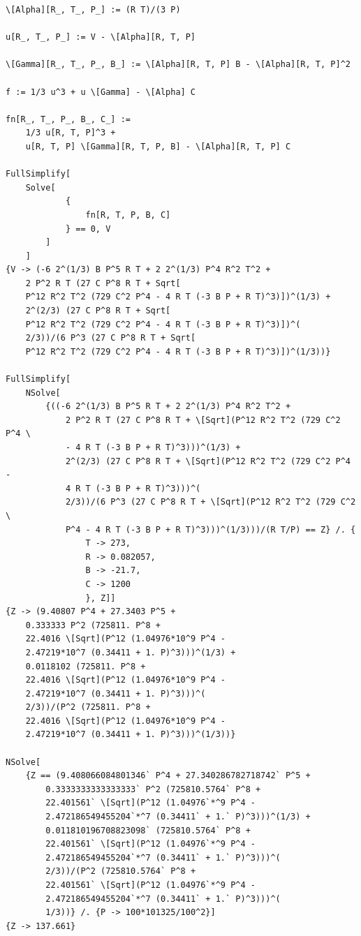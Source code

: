 \documentclass{IMTexam}
\begin{document}
\begin{questions}
\begin{parts}
\begin{solution}
            \end{solution}
        \end{parts}

        \appendix\label{code:math}

        \begin{lstlisting}
\[Alpha][R_, T_, P_] := (R T)/(3 P)

u[R_, T_, P_] := V - \[Alpha][R, T, P]

\[Gamma][R_, T_, P_, B_] := \[Alpha][R, T, P] B - \[Alpha][R, T, P]^2

f := 1/3 u^3 + u \[Gamma] - \[Alpha] C

fn[R_, T_, P_, B_, C_] :=
    1/3 u[R, T, P]^3 +
    u[R, T, P] \[Gamma][R, T, P, B] - \[Alpha][R, T, P] C

FullSimplify[
    Solve[
            {
                fn[R, T, P, B, C]
            } == 0, V
        ]
    ]
{V -> (-6 2^(1/3) B P^5 R T + 2 2^(1/3) P^4 R^2 T^2 +
    2 P^2 R T (27 C P^8 R T + Sqrt[
    P^12 R^2 T^2 (729 C^2 P^4 - 4 R T (-3 B P + R T)^3)])^(1/3) +
    2^(2/3) (27 C P^8 R T + Sqrt[
    P^12 R^2 T^2 (729 C^2 P^4 - 4 R T (-3 B P + R T)^3)])^(
    2/3))/(6 P^3 (27 C P^8 R T + Sqrt[
    P^12 R^2 T^2 (729 C^2 P^4 - 4 R T (-3 B P + R T)^3)])^(1/3))}

FullSimplify[
    NSolve[
        {((-6 2^(1/3) B P^5 R T + 2 2^(1/3) P^4 R^2 T^2 +
            2 P^2 R T (27 C P^8 R T + \[Sqrt](P^12 R^2 T^2 (729 C^2 P^4 \
            - 4 R T (-3 B P + R T)^3)))^(1/3) +
            2^(2/3) (27 C P^8 R T + \[Sqrt](P^12 R^2 T^2 (729 C^2 P^4 -
            4 R T (-3 B P + R T)^3)))^(
            2/3))/(6 P^3 (27 C P^8 R T + \[Sqrt](P^12 R^2 T^2 (729 C^2 \
            P^4 - 4 R T (-3 B P + R T)^3)))^(1/3)))/(R T/P) == Z} /. {
                T -> 273,
                R -> 0.082057,
                B -> -21.7,
                C -> 1200
                }, Z]]
{Z -> (9.40807 P^4 + 27.3403 P^5 +
    0.333333 P^2 (725811. P^8 +
    22.4016 \[Sqrt](P^12 (1.04976*10^9 P^4 -
    2.47219*10^7 (0.34411 + 1. P)^3)))^(1/3) +
    0.0118102 (725811. P^8 +
    22.4016 \[Sqrt](P^12 (1.04976*10^9 P^4 -
    2.47219*10^7 (0.34411 + 1. P)^3)))^(
    2/3))/(P^2 (725811. P^8 +
    22.4016 \[Sqrt](P^12 (1.04976*10^9 P^4 -
    2.47219*10^7 (0.34411 + 1. P)^3)))^(1/3))}

NSolve[
    {Z == (9.408066084801346` P^4 + 27.340286782718742` P^5 +
        0.3333333333333333` P^2 (725810.5764` P^8 +
        22.401561` \[Sqrt](P^12 (1.04976`*^9 P^4 -
        2.472186549455204`*^7 (0.34411` + 1.` P)^3)))^(1/3) +
        0.011810196708823098` (725810.5764` P^8 +
        22.401561` \[Sqrt](P^12 (1.04976`*^9 P^4 -
        2.472186549455204`*^7 (0.34411` + 1.` P)^3)))^(
        2/3))/(P^2 (725810.5764` P^8 +
        22.401561` \[Sqrt](P^12 (1.04976`*^9 P^4 -
        2.472186549455204`*^7 (0.34411` + 1.` P)^3)))^(
        1/3))} /. {P -> 100*101325/100^2}]
{Z -> 137.661}
        \end{lstlisting}

    \end{questions}
\end{document}
